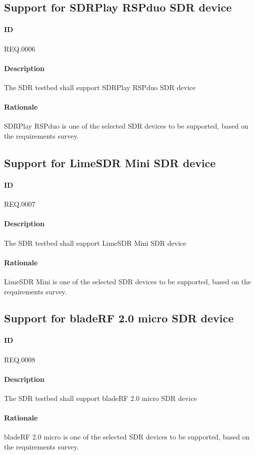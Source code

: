 \documentclass[english,titlepage,a4paper]{report}
\begin{document}
\subsection{Support for SDRPlay RSPduo SDR device}
\paragraph{ID}
REQ.0006
\paragraph{Description}
The SDR testbed shall support SDRPlay RSPduo SDR device
\paragraph{Rationale}
SDRPlay RSPduo is one of the selected SDR devices to be supported, based on the requirements survey.

\subsection{Support for LimeSDR Mini SDR device}
\paragraph{ID}
REQ.0007
\paragraph{Description}
The SDR testbed shall support LimeSDR Mini SDR device
\paragraph{Rationale}
LimeSDR Mini is one of the selected SDR devices to be supported, based on the requirements survey.

\subsection{Support for bladeRF 2.0 micro SDR device}
\paragraph{ID}
REQ.0008
\paragraph{Description}
The SDR testbed shall support bladeRF 2.0 micro SDR device
\paragraph{Rationale}
bladeRF 2.0 micro is one of the selected SDR devices to be supported, based on the requirements survey.
\end{document}
